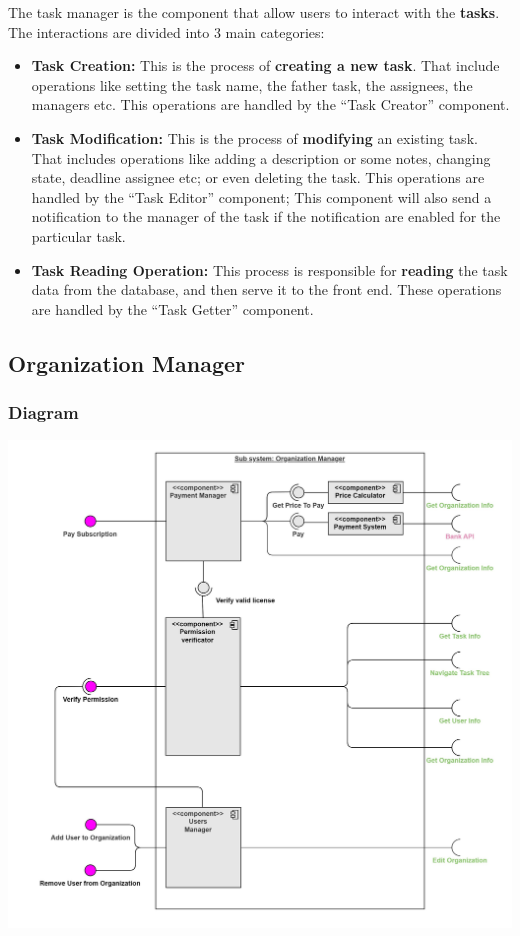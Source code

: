 \documentclass{article}
\begin{document}
The task manager is the component that allow users to interact with the \textbf{tasks}.
The interactions are divided into 3 main categories:
\begin{itemize}
    \item \textbf{Task Creation: }
    This is the process of \textbf{creating a new task}. That include operations like 
    setting the task name, the father task, the assignees, the managers etc.
    This operations are handled by the ``Task Creator'' component.
    \item \textbf{Task Modification: }
    This is the process of \textbf{modifying} an existing task. That includes operations like adding a description or some notes,
    changing state, deadline assignee etc; or even deleting the task.
    This operations are handled by the ``Task Editor'' component; This component will also send a notification to the manager of the task if the notification are enabled for the particular task.
    \item \textbf{Task Reading Operation: }
    This process is responsible for \textbf{reading} the task data from the database, and then serve it to the front end.
    These operations are handled by the ``Task Getter'' component.
\end{itemize}


\subsection{Organization Manager}
\subsubsection{Diagram}
\includegraphics[width=\textwidth,height=\textheight,keepaspectratio]{images/component_diagram/organization_manager.jpg}
\end{document}
